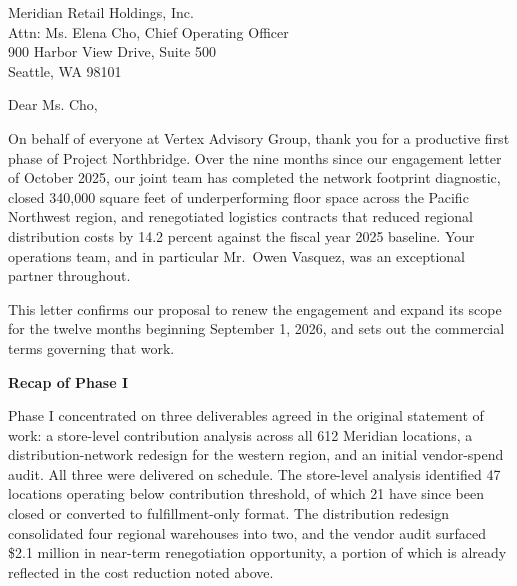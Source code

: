 \documentclass[a4paper,11pt,oneside,foldmarks,rightdate]{akletter}
\newcommand{\vxjobtitle}[1]{\def\vxjobtitlevalue{#1}}
\def\vxjobtitlevalue{}
\newcommand{\vxsection}[1]{%
  \par\vspace{10pt}\noindent
  {\color{vxnavy}\bfseries\fontsize{11}{13}\selectfont #1}\par
  \vspace{2pt}\noindent{\color{vxgold}\rule{\linewidth}{0.7pt}}\par
  \vspace{6pt}}
\begin{document}
\vxjobtitle{Senior Partner, Retail \& Consumer Practice}
\signature{Jonathan Reyes\\\textit{Senior Partner}}

\begin{letter}{Meridian Retail Holdings, Inc.\\Attn: Ms. Elena Cho, Chief Operating Officer\\900 Harbor View Drive, Suite 500\\Seattle, WA 98101}


\subject{Renewal and Expansion of Strategic Advisory Engagement --- Project Northbridge}

\opening{Dear Ms. Cho,}

On behalf of everyone at Vertex Advisory Group, thank you for a productive first phase of Project Northbridge. Over the nine months since our engagement letter of October 2025, our joint team has completed the network footprint diagnostic, closed 340,000 square feet of underperforming floor space across the Pacific Northwest region, and renegotiated logistics contracts that reduced regional distribution costs by 14.2 percent against the fiscal year 2025 baseline. Your operations team, and in particular Mr.\ Owen Vasquez, was an exceptional partner throughout.

This letter confirms our proposal to renew the engagement and expand its scope for the twelve months beginning September 1, 2026, and sets out the commercial terms governing that work.

\vxsection{Recap of Phase I}

Phase I concentrated on three deliverables agreed in the original statement of work: a store-level contribution analysis across all 612 Meridian locations, a distribution-network redesign for the western region, and an initial vendor-spend audit. All three were delivered on schedule. The store-level analysis identified 47 locations operating below contribution threshold, of which 21 have since been closed or converted to fulfillment-only format. The distribution redesign consolidated four regional warehouses into two, and the vendor audit surfaced \$2.1 million in near-term renegotiation opportunity, a portion of which is already reflected in the cost reduction noted above.


\end{letter}
\end{document}
